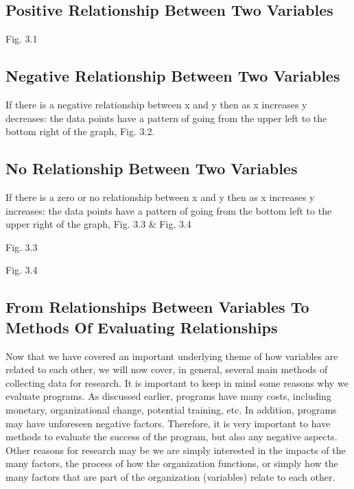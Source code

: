 \documentclass[]{book}
\theoremstyle{definition}
\theoremstyle{definition}
\theoremstyle{definition}
\theoremstyle{remark}
\begin{document}
\hypertarget{positive-relationship-between-two-variables}{%
\subsection{Positive Relationship Between Two
Variables}\label{positive-relationship-between-two-variables}}

Fig. 3.1

\hypertarget{negative-relationship-between-two-variables}{%
\subsection{Negative Relationship Between Two
Variables}\label{negative-relationship-between-two-variables}}

If there is a negative relationship between x and y then as x increases
y decreases: the data points have a pattern of going from the upper left
to the bottom right of the graph, Fig. 3.2.

\hypertarget{no-relationship-between-two-variables}{%
\subsection{No Relationship Between Two
Variables}\label{no-relationship-between-two-variables}}

If there is a zero or no relationship between x and y then as x
increases y increases: the data points have a pattern of going from the
bottom left to the upper right of the graph, Fig. 3.3 \& Fig. 3.4

Fig. 3.3

Fig. 3.4

\hypertarget{from-relationships-between-variables-to-methods-of-evaluating-relationships}{%
\subsection{From Relationships Between Variables To Methods Of
Evaluating
Relationships}\label{from-relationships-between-variables-to-methods-of-evaluating-relationships}}

Now that we have covered an important underlying theme of how variables
are related to each other, we will now cover, in general, several main
methods of collecting data for research. It is important to keep in mind
some reasons why we evaluate programs. As discussed earlier, programs
have many costs, including monetary, organizational change, potential
training, etc. In addition, programs may have unforeseen negative
factors. Therefore, it is very important to have methods to evaluate the
success of the program, but also any negative aspects. Other reasons for
research may be we are simply interested in the impacts of the many
factors, the process of how the organization functions, or simply how
the many factors that are part of the organization (variables) relate to
each other.
\end{document}
